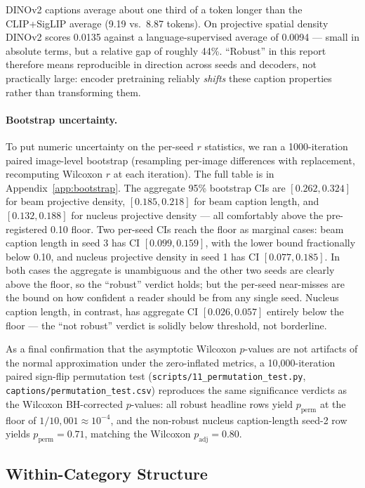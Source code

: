 \documentclass[11pt]{article}
\newcommand{\code}[1]{\texttt{#1}}
\begin{document}
DINOv2 captions average about one third of a token longer than the CLIP+SigLIP
average (9.19 vs.\ 8.87 tokens). On projective spatial density DINOv2 scores
0.0135 against a language-supervised average of 0.0094 --- small in absolute
terms, but a relative gap of roughly 44\%. ``Robust'' in this report therefore
means reproducible in direction across seeds and decoders, not practically
large: encoder pretraining reliably \emph{shifts} these caption properties
rather than transforming them.

\paragraph{Bootstrap uncertainty.} To put numeric uncertainty on the
per-seed \(r\) statistics, we ran a 1000-iteration paired image-level
bootstrap (resampling per-image differences with replacement, recomputing
Wilcoxon \(r\) at each iteration). The full table is in
Appendix~\ref{app:bootstrap}. The aggregate 95\% bootstrap CIs are
\([0.262, 0.324]\) for beam projective density,
\([0.185, 0.218]\) for beam caption length, and
\([0.132, 0.188]\) for nucleus projective density --- all comfortably
above the pre-registered 0.10 floor. Two per-seed CIs reach the floor as marginal cases: beam caption length
in seed 3 has CI \([0.099, 0.159]\), with the lower bound fractionally
below 0.10, and nucleus projective density in seed 1 has CI
\([0.077, 0.185]\). In both cases the aggregate is unambiguous and
the other two seeds are clearly above the floor, so the ``robust'' verdict
holds; but the per-seed near-misses are the bound on how confident a
reader should be from any single seed. Nucleus caption length, in
contrast, has aggregate CI \([0.026, 0.057]\) entirely below the floor ---
the ``not robust'' verdict is solidly below threshold, not borderline.

As a final confirmation that the asymptotic Wilcoxon \(p\)-values are not
artifacts of the normal approximation under the zero-inflated metrics, a
10{,}000-iteration paired sign-flip permutation test
(\code{scripts/11\_permutation\_test.py},
\code{captions/permutation\_test.csv}) reproduces the same significance
verdicts as the Wilcoxon BH-corrected \(p\)-values: all robust headline
rows yield \(p_{\text{perm}}\) at the floor of \(1/10{,}001\!\approx\!10^{-4}\),
and the non-robust nucleus caption-length seed-2 row yields
\(p_{\text{perm}}\!=\!0.71\), matching the Wilcoxon \(p_{\text{adj}}\!=\!0.80\).

\subsection{Within-Category Structure}
\label{sec:within}
\end{document}
